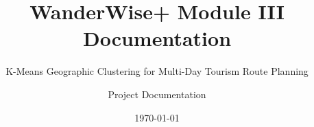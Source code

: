 \documentclass[12pt,a4paper,oneside]{book}
\title{WanderWise+ Module III Documentation}
\subtitle{K-Means Geographic Clustering for Multi-Day Tourism Route Planning}
\author{Project Documentation}
\date{\today}
\begin{document}
\frontmatter
\maketitle
\tableofcontents

\mainmatter








\backmatter
\nocite{*}


\end{document}
